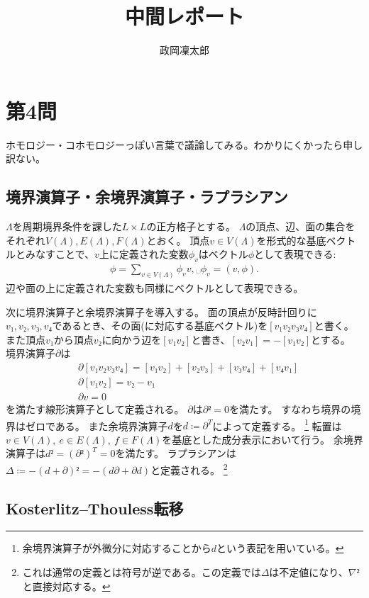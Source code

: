 \documentclass[12pt]{ltjsarticle}
\begin{document}
\title{中間レポート}
\author{政岡凜太郎}
\maketitle

\section*{第4問}

ホモロジー・コホモロジーっぽい言葉で議論してみる。わかりにくかったら申し訳ない。

\subsection*{境界演算子・余境界演算子・ラプラシアン}
$Λ$を周期境界条件を課した$L × L$の正方格子とする。
$Λ$の頂点、辺、面の集合をそれぞれ$𝑉(Λ), 𝐸(Λ), 𝐹(Λ)$とおく。
頂点$v ∈ 𝑉(Λ)$を形式的な基底ベクトルとみなすことで、$v$上に定義された変数$ϕ_v$はベクトル$ϕ$として表現できる:
\begin{align}
    ϕ = ∑_{v ∈ 𝑉(Λ)}ϕ_v v,␣ ϕ_v = (v,ϕ).
\end{align}
辺や面の上に定義された変数も同様にベクトルとして表現できる。

次に境界演算子と余境界演算子を導入する。
面の頂点が反時計回りに$v₁,v₂,v₃,v₄$であるとき、その面(に対応する基底ベクトル)を$[v₁v₂v₃v₄]$と書く。
また頂点$v₁$から頂点$v₂$に向かう辺を$[v₁v₂]$と書き、$[v₂v₁] = -[v₁v₂]$とする。
境界演算子$∂$は
\begin{align}&
    ∂[v₁v₂v₃v₄] = [v₁v₂] + [v₂v₃] + [v₃v₄] + [v₄v₁] \\
    &
    ∂[v₁v₂] = v₂ - v₁ \\
    &
    ∂v = 0
\end{align}
を満たす線形演算子として定義される。
$∂$は$∂² = 0$を満たす。
すなわち境界の境界はゼロである。
また余境界演算子$𝑑$を$𝑑 ≔ ∂^𝑇$によって定義する。
\footnote{
    余境界演算子が外微分に対応することから$𝑑$という表記を用いている。
}
転置は$v ∈ 𝑉(Λ),~e ∈ 𝐸(Λ),~f ∈ 𝐹(Λ)$を基底とした成分表示において行う。
余境界演算子は$𝑑² = (∂²)^𝑇 = 0$を満たす。
ラプラシアンは$Δ ≔ -(𝑑+∂)² = -(𝑑∂+∂𝑑)$と定義される。
\footnote{
    これは通常の定義とは符号が逆である。この定義では$Δ$は不定値になり、$∇²$と直接対応する。
}

\subsection*{Kosterlitz--Thouless転移}
\end{document}
